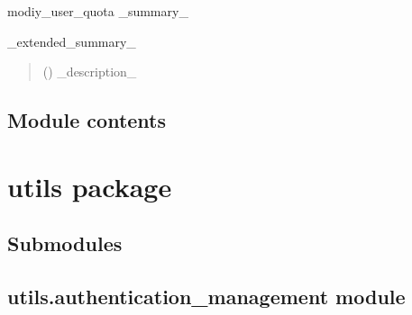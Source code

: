 \documentclass[letterpaper,10pt,english]{sphinxmanual}
\begin{document}
\begin{fulllineitems}
\label{\detokenize{tests:tests.test_modify_quota.modify_user_quota}}
\pysigstartsignatures
{}
\pysigstopsignatures
\sphinxAtStartPar
modiy\_user\_quota \_summary\_

\sphinxAtStartPar
\_extended\_summary\_
\begin{quote}\begin{description}
\sphinxAtStartPar
{} () \textendash{} \_description\_

\end{description}\end{quote}

\end{fulllineitems}



\subsection{Module contents}
\label{\detokenize{tests:module-tests}}\label{\detokenize{tests:module-contents}}
\sphinxstepscope


\section{utils package}
\label{\detokenize{utils:utils-package}}\label{\detokenize{utils::doc}}

\subsection{Submodules}
\label{\detokenize{utils:submodules}}

\subsection{utils.authentication\_management module}
\label{\detokenize{utils:module-utils.authentication_management}}\label{\detokenize{utils:utils-authentication-management-module}}
\end{document}
